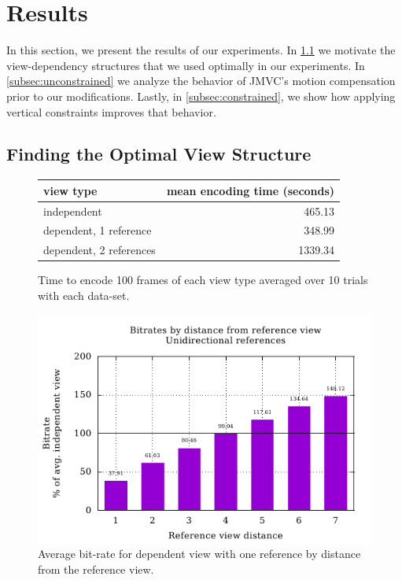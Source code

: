 \documentclass{sig-alternate-05-2015}
\begin{document}
\section{Results} %
\label{sec:results} %
In this section, we present the results of our experiments. In
\ref{subsec:optimal} we motivate the view-dependency structures that we used
optimally in our experiments. In \ref{subsec:unconstrained} we analyze the
behavior of JMVC's motion compensation prior to our modifications. Lastly, in
\ref{subsec:constrained}, we show how applying vertical constraints improves
that behavior.

\subsection{Finding the Optimal View Structure}
\label{subsec:optimal}

\begin{figure}[h]
\centering
\begin{tabular}{|l|r|}
\hline
view type               & mean encoding time (seconds) \\
\hline
independent             & 465.13                       \\
dependent, 1 reference  & 348.99                       \\
dependent, 2 references & 1339.34                      \\
\hline
\end{tabular}
\caption{Time to encode 100 frames of each view type averaged over 10 trials
with each data-set.}
\label{fig:view-type-times}
\end{figure}

\begin{figure}[h]
\centering
\includegraphics[scale=.68]{figures/motion_vector_data_unconstrained_unidirectional.pdf}
\caption{
Average bit-rate for dependent view with one reference by distance from the
reference view.
}
\label{fig:uniframes}
\end{figure}
\end{document}
